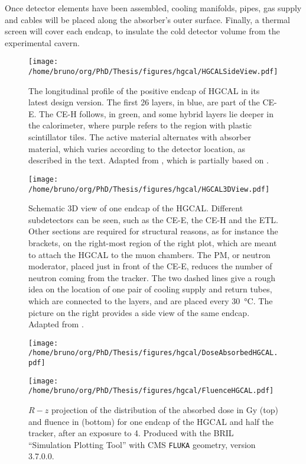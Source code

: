 \documentclass[11pt]{article}
\begin{document}
Once detector elements have been assembled, cooling manifolds, pipes, gas supply and cables will be placed along the absorber's outer surface. Finally, a thermal screen will cover each endcap, to insulate the cold detector volume from the experimental cavern.

\begin{figure}
\begin{center}
\texttt{[image: /home/bruno/org/PhD/Thesis/figures/hgcal/HGCALSideView.pdf]}
\end{center}
\caption{\label{fig:hgcal_side_view}The longitudinal profile of the positive endcap of \ac{HGCAL} in its latest design version. The first \num{26} layers, in blue, are part of the \ac{CE-E}. The \ac{CE-H} follows, in green, and some hybrid layers lie deeper in the calorimeter, where purple refers to the region with plastic scintillator tiles. The active material alternates with absorber material, which varies according to the detector location, as described in the text. Adapted from \cite{hgcal_web}, which is partially based on \cite{hgcalTDR}.}
\end{figure}

\begin{figure}
\texttt{[image: /home/bruno/org/PhD/Thesis/figures/hgcal/HGCAL3DView.pdf]}
\caption{\label{fig:hgcal_3d_view}Schematic 3D view of one endcap of the \ac{HGCAL}. Different subdetectors can be seen, such as the \ac{CE-E}, the \ac{CE-H} and the \ac{ETL}. Other sections are required for structural reasons, as for instance the brackets, on the right-most region of the right plot, which are meant to attach the \ac{HGCAL} to the muon chambers. The \ac{PM}, or neutron moderator, placed just in front of the \ac{CE-E}, reduces the number of neutron coming from the tracker. The two dashed lines give a rough idea on the location of one pair of cooling supply and return tubes, which are connected to the layers, and are placed every \SI{30}{\celsius}. The picture on the right provides a side view of the same endcap. Adapted from \cite{hgcalTDR}.}
\end{figure}

\begin{figure}
\begin{center}
\texttt{[image: /home/bruno/org/PhD/Thesis/figures/hgcal/DoseAbsorbedHGCAL.pdf]}
\end{center}
\begin{center}
\texttt{[image: /home/bruno/org/PhD/Thesis/figures/hgcal/FluenceHGCAL.pdf]}
\end{center}
\caption{\label{fig:dose_fluence_hgcal}\(R-z\) projection of the distribution of the absorbed dose in \si{\gray} (top) and fluence in \si{\nequiv} (bottom) for one endcap of the \ac{HGCAL} and half the tracker, after an exposure to \SI{4}{\invab}. Produced with the \ac{BRIL} ``Simulation Plotting Tool'' \cite{bril_tool}  with \ac{CMS} \texttt{FLUKA} geometry, version 3.7.0.0.}
\end{figure}
\end{document}
